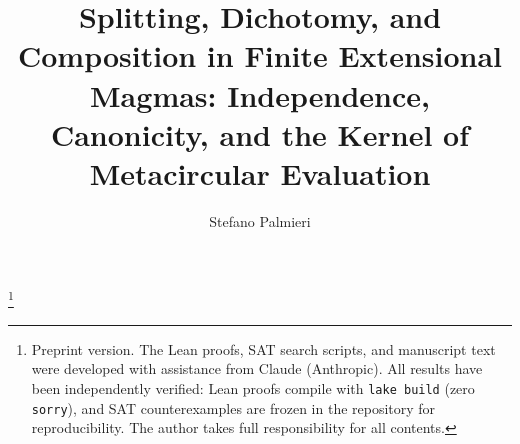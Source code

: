\documentclass[sigconf,screen]{acmart}
\theoremstyle{remark}
\begin{document}
\title{Splitting, Dichotomy, and Composition in Finite Extensional Magmas: Independence, Canonicity, and the Kernel of Metacircular Evaluation}
\thanks{Preprint version. The Lean proofs, SAT search scripts, and manuscript text were developed with assistance from Claude (Anthropic). All results have been independently verified: Lean proofs compile with \texttt{lake build} (zero \texttt{sorry}), and SAT counterexamples are frozen in the repository for reproducibility. The author takes full responsibility for all contents.}

\author{Stefano Palmieri}

\end{document}
